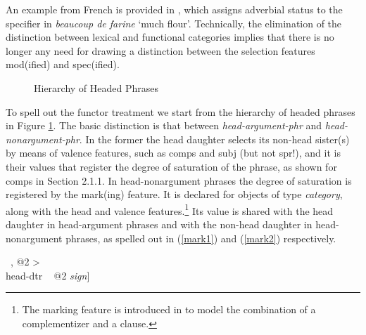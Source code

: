 \documentclass[output=paper]{langsci/langscibook}
\begin{document}
\noindent
An example from French is provided in \citet{Abeilleetal04}, 
which assigns adverbial status to the specifier in 
{\it beaucoup de farine\/} `much flour'.  
Technically, the elimination of the distinction between lexical and 
functional categories implies that there is no longer any need for 
drawing a distinction between the selection features {\sc mod(ified)} and {\sc spec(ified)}. 

\begin{figure}
\begin{center} 
\footnotesize
{}
\caption{\label{typ} Hierarchy of Headed Phrases }
\normalsize
\end{center}
\end{figure}

To spell out the functor treatment we start from the 
hierarchy of headed phrases in Figure \ref{typ}. The basic distinction is
that between {\it head-argument-phr\/} and {\it head-nonargument-phr\/}. 
In the former the head daughter selects its non-head sister(s) by means of 
valence features, such as {\sc comps} and {\sc subj} (but not {\sc spr}!), 
and it is their values that register the degree of saturation of the phrase, 
as shown for {\sc comps} in Section 2.1.1.  
In head-nonargument phrases the degree of saturation is registered  
by the {\sc mark(ing)} feature. It is declared for objects of type {\it category}, 
along with the {\sc head} and valence features.\footnote{The {\sc marking} feature  
is introduced in \citet[46]{PS94} to model the combination of a complementizer 
and a clause.} Its value is shared with the head daughter in head-argument phrases
and with the non-head daughter in head-nonargument phrases, as spelled out in 
(\ref{mark1}) and (\ref{mark2}) respectively. 

\begin{exe}
\ex\label{mark1} 
\begin{avm}
\end{avm}
\ex\label{mark2} 
\begin{avm}
[{\it head-nonarg-phr\/}                    \\
 synsem|loc|cat|mark ~ @1 {\it marking\/}   \\
 dtrs ~ <[synsem|loc|cat|mark ~ @1] ~, @2 > \\
 head-dtr ~ @2 {\it sign\/}]
\end{avm}
\end{exe}
\end{document}
